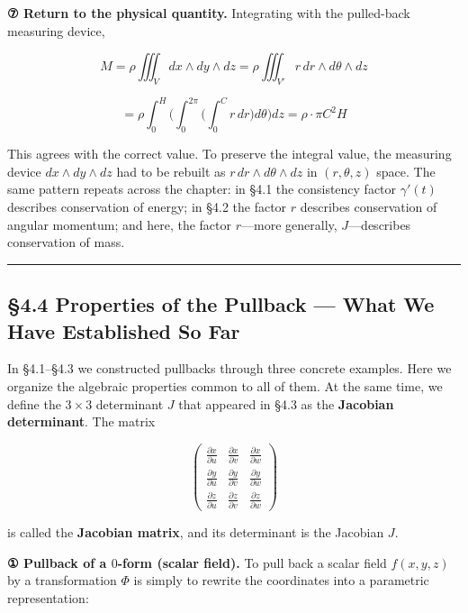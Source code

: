 \textbf{⑦ Return to the physical quantity.} Integrating with the
pulled-back measuring device,

\[
M
=
\rho\iiint_V dx\wedge dy\wedge dz
=
\rho\iiint_{V'} r\,dr\wedge d\theta\wedge dz
\]

\[
=
\rho
\int_0^H
\biggl(
  \int_0^{2\pi}
  \biggl(
    \int_0^C r\,dr
  \biggr)
  d\theta
\biggr)
dz
=
\rho\cdot\pi C^2H
\]

This agrees with the correct value. To preserve the integral value, the
measuring device \(dx \wedge dy \wedge dz\) had to be rebuilt as
\(r\,dr \wedge d\theta \wedge dz\) in \((r,\theta,z)\) space. The same
pattern repeats across the chapter: in §4.1 the consistency factor
\(\gamma'(t)\) describes conservation of energy; in §4.2 the factor
\(r\) describes conservation of angular momentum; and here, the factor
\(r\)---more generally, \(J\)---describes conservation of mass.

\begin{center}\rule{0.5\linewidth}{0.5pt}\end{center}

\hypertarget{properties-of-the-pullback-what-we-have-established-so-far}{%
\subsection{§4.4 Properties of the Pullback --- What We Have Established
So
Far}\label{properties-of-the-pullback-what-we-have-established-so-far}}

In §4.1--§4.3 we constructed pullbacks through three concrete examples.
Here we organize the algebraic properties common to all of them. At the
same time, we define the \(3 \times 3\) determinant \(J\) that appeared
in §4.3 as the \textbf{Jacobian determinant}. The matrix

\[\begin{pmatrix}
\frac{\partial x}{\partial u} & \frac{\partial x}{\partial v} & \frac{\partial x}{\partial w} \\[4pt]
\frac{\partial y}{\partial u} & \frac{\partial y}{\partial v} & \frac{\partial y}{\partial w} \\[4pt]
\frac{\partial z}{\partial u} & \frac{\partial z}{\partial v} & \frac{\partial z}{\partial w}
\end{pmatrix}\]

is called the \textbf{Jacobian matrix}, and its determinant is the
Jacobian \(J\).

\textbf{① Pullback of a $0$-form (scalar field).} To pull back a scalar
field \(f(x,y,z)\) by a transformation \(\Phi\) is simply to rewrite the
coordinates into a parametric representation:

